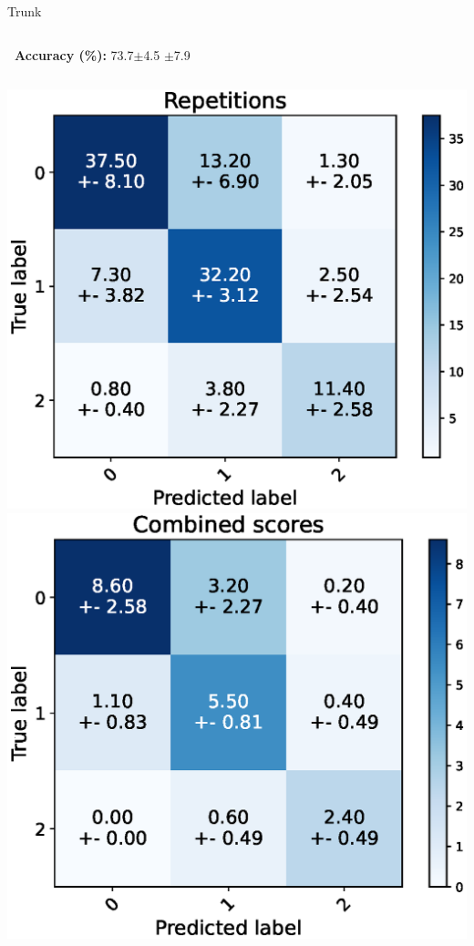 \begin{frame}[fragile]{Trunk}
  \begin{columns}
    \textbf{\small~Accuracy (\%):} 73.7$\pm$4.5
    \vspace{0.3cm}
    $\pm$7.9
    \vspace{0.3cm}
  \end{columns}
  \begin{columns}
    \centering
    \includegraphics[width=\textwidth]{files/figs/res/trunk/cnf-reps.eps}
    \centering
    \includegraphics[width=\textwidth]{files/figs/res/trunk/cnf-combined.eps}

\end{columns}
\end{frame}
